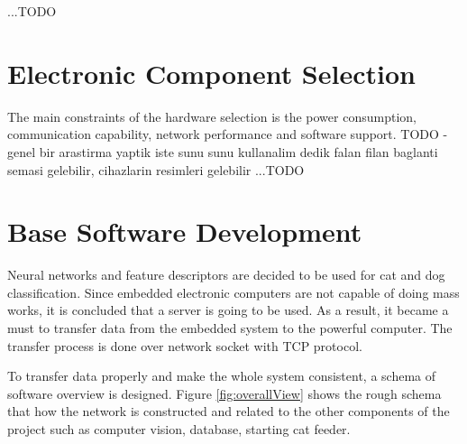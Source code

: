 \documentclass[12pt]{article}
\begin{document}
...TODO
\pagebreak

\section{Electronic Component Selection}
\label{sec:electronic}
The main constraints of the hardware selection is the power consumption, communication capability, network performance and software support. TODO - genel bir arastirma yaptik iste sunu sunu kullanalim dedik falan filan
baglanti semasi gelebilir, cihazlarin resimleri gelebilir
...TODO
\pagebreak

\section{Base Software Development}
\label{sec:software}

Neural networks and feature descriptors are decided to be used for cat and dog classification. Since embedded electronic computers are not capable of doing mass works, it is concluded that a server is going to be used. As a result, it became a must to transfer data from the embedded system to the powerful computer. The transfer process is done over network socket with TCP protocol.

To transfer data properly and make the whole system consistent, a schema of software overview is designed. Figure \ref{fig:overallView} shows the rough schema that how the network is constructed and related to the other components of the project such as computer vision, database, starting cat feeder.
\end{document}
